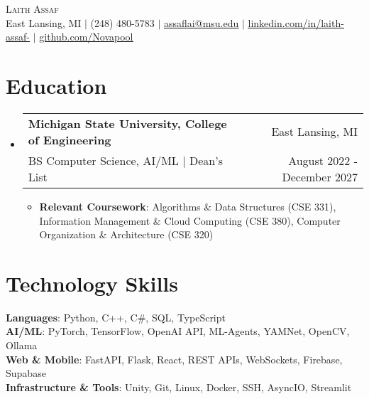 \documentclass[letterpaper,11pt]{article}
\makeatletter
\newcommand{\resumeItem}[1]{
  \item\small{
    {#1 \vspace{-2pt}}
  }
}
\newcommand{\resumeSubheading}[4]{
  \vspace{-2pt}\item
    \begin{tabular*}{0.97\textwidth}[t]{l@{\extracolsep{\fill}}r}
      \textbf{#1} & \small #2 \\
      \small#3 & \small #4 \\
    \end{tabular*}\vspace{-7pt}
}
\newcommand{\resumeSubHeadingListStart}{\begin{itemize}[leftmargin=0.15in, label={}]}
\newcommand{\resumeSubHeadingListEnd}{\end{itemize}}
\newcommand{\resumeItemListStart}{\begin{itemize}}
\newcommand{\resumeItemListEnd}{\end{itemize}\vspace{-5pt}}
\makeatother
\begin{document}
\begin{center}
    {\Huge \scshape Laith Assaf} \\ \vspace{1pt}
    \small East Lansing, MI $|$ (248) 480-5783 $|$ \href{mailto:assaflai@msu.edu}{\underline{assaflai@msu.edu}} $|$ \href{https://linkedin.com/in/laith-assaf-}{\underline{linkedin.com/in/laith-assaf-}} $|$ \href{https://github.com/Novapool}{\underline{github.com/Novapool}}
\end{center}

\section{Education}
  \resumeSubHeadingListStart
    \resumeSubheading
      {Michigan State University, College of Engineering}{East Lansing, MI}
      {BS Computer Science, AI/ML $|$ Dean's List}{August 2022 - December 2027}
      \resumeItemListStart
        \resumeItem{\textbf{Relevant Coursework}: Algorithms \& Data Structures (CSE 331), Information Management \& Cloud Computing (CSE 380), Computer Organization \& Architecture (CSE 320)}
      \resumeItemListEnd
  \resumeSubHeadingListEnd

\section{Technology Skills}
 \begin{itemize}[leftmargin=0.15in, label={}]
    \small{\item{
     \textbf{Languages}{: Python, C++, C\#, SQL, TypeScript} \\
     \textbf{AI/ML}{: PyTorch, TensorFlow, OpenAI API, ML-Agents, YAMNet, OpenCV, Ollama} \\
     \textbf{Web \& Mobile}{: FastAPI, Flask, React, REST APIs, WebSockets, Firebase, Supabase} \\
     \textbf{Infrastructure \& Tools}{: Unity, Git, Linux, Docker, SSH, AsyncIO, Streamlit}
    }}
 \end{itemize}

\end{document}
